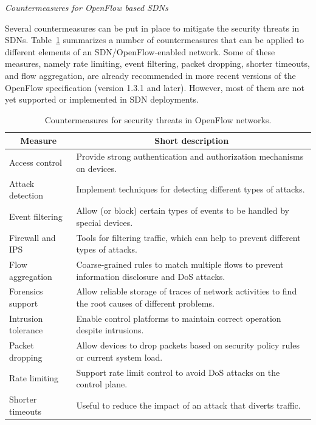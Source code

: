 \vspace{2mm}
\noindent \textit{Countermeasures for OpenFlow based SDNs}

Several countermeasures can be put in place to mitigate the security threats in SDNs.
Table~\ref{tab:countermeasuresthreats} summarizes a number of countermeasures that can be applied to different 
elements of an SDN/OpenFlow-enabled network. Some of these measures, namely rate limiting, event filtering, 
packet dropping, shorter timeouts, and flow aggregation, are already recommended in more recent 
versions of the OpenFlow specification (version 1.3.1 and later). 
However, most of them are not yet supported or implemented in SDN deployments.

{\renewcommand{\arraystretch}{1.4}
\begin{table}[!htp]
\caption{Countermeasures for security threats in OpenFlow networks.}
\label{tab:countermeasuresthreats}
\begin{center}
\footnotesize
\begin{tabularx}{\columnwidth}{lX}
\hline
\multicolumn{1}{c}{\textbf{Measure}} & \multicolumn{1}{c}{\textbf{Short description}} \\\hline
Access control       & Provide strong authentication and authorization mechanisms on devices.  \\\hline
Attack detection     & Implement techniques for detecting different types of attacks. \\\hline
Event filtering         & Allow (or block) certain types of events to be handled by special devices. \\\hline
Firewall and IPS     & Tools for filtering traffic, which can help to prevent different types of attacks. \\\hline
Flow aggregation   & Coarse-grained rules to match multiple flows to prevent information disclosure and DoS attacks. \\\hline
Forensics support  & Allow reliable storage of traces of network activities to find the root causes of different problems.  \\\hline
Intrusion tolerance &  Enable control platforms to maintain correct operation despite intrusions. \\\hline
Packet dropping     & Allow devices to drop packets based on security policy rules or current system load. \\\hline
Rate limiting           & Support rate limit control to avoid DoS attacks on the control plane. \\\hline
Shorter timeouts  & Useful to reduce the impact of an attack that diverts traffic.  \\\hline
\end{tabularx}
\end{center}
\end{table}
}

